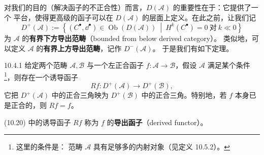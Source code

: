 对我们的目的（解决函子的不正合性）而言，$D(\mathcal A)$ 的重要性在于：它提供了一个
平台，使得更高级的函子可以在 $D(\mathcal A)$ 的层面上定义。在此之前，让我们记
\[
D^+(\mathcal A):=
\left\{(C^\bullet,\dd^\bullet)\in\operatorname{Ob}(D(\mathcal A))\ \middle|\
H^k(C^\bullet)=0\ \text{对}\ k\ll0\right\}
\]
为 $\mathcal A$ 的\textbf{有界下方导出范畴}（bounded from below derived category）。
类似地，可以定义 $\mathcal A$ 的\textbf{有界上方导出范畴}，记作 $D^-(\mathcal A)$。
于是我们有如下定理。

\begin{wthm}{10.4.1}
给定两个范畴 $\mathcal A,\mathcal B$ 与一个左正合函子
$f:\mathcal A\to\mathcal B$，假设 $\mathcal A$ 满足某个条件\footnote{这里的条件是：
范畴 $\mathcal A$ 具有足够多的内射对象（见定义 10.5.2）。}，则存在一个诱导函子
\begin{equation}\tag{10.20}
Rf:D^+(\mathcal A)\to D^+(\mathcal B),
\end{equation}
它把 $D^+(\mathcal A)$ 中的正合三角映为 $D^+(\mathcal B)$ 中的正合三角。特别地，若 $f$
本身已是正合的，则 $Rf=f$。
\end{wthm}


(10.20) 中的诱导函子 $Rf$ 称为 $f$ 的\textbf{导出函子}（derived functor）。

